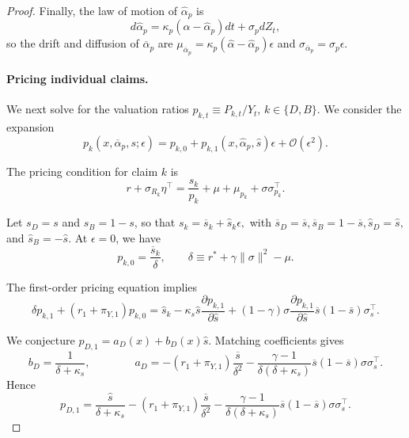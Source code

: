 \begin{proof}
Finally, the law of motion of $\hat{\alpha}_p$ is
\begin{equation}
    d \hat{\alpha}_p = \kappa_p ( \hat{\alpha} - \hat{\alpha}_p )dt + \sigma_p d Z_t,
\end{equation}
so the drift and diffusion of $\overline{\alpha}_p$ are $\mu_{\overline{\alpha}_p} = \kappa_p ( \hat{\alpha} - \hat{\alpha}_p )\epsilon$ and $\sigma_{\overline{\alpha}_p} = \sigma_p \epsilon$.

\paragraph{Pricing individual claims.}
We next solve for the valuation ratios $p_{k,t} \equiv P_{k,t}/Y_t$, $k\in\{D,B\}$.
We consider the expansion
\begin{equation}
    p_k(x, \overline{\alpha}_p, s;\epsilon) = p_{k,0} + p_{k,1}(x, \hat{\alpha}_p, \hat{s}) \epsilon + \mathcal{O}(\epsilon^2).
\end{equation}

The pricing condition for claim $k$ is
\begin{equation}
    r + \sigma_{R_k} \eta^\top = \frac{s_k}{p_{k}} + \mu + \mu_{p_k} + \sigma \sigma_{p_k}^\top.
\end{equation}

Let $s_D=s$ and $s_B=1-s$, so that
$
    s_k = \overline{s}_k + \hat{s}_k \epsilon,
$
with
$
    \overline{s}_D=\overline{s}, \overline{s}_B=1-\overline{s}, 
    \hat{s}_D=\hat{s}, 
$ and $\hat{s}_B=-\hat{s}$.
At $\epsilon=0$, we have
\begin{equation}
    p_{k,0} = \frac{\overline{s}_k}{\delta}, \qquad
    \delta \equiv r^* + \gamma\|\sigma\|^2 - \mu.
\end{equation}

The first-order pricing equation implies
\begin{equation}
    \delta p_{k,1} + (r_1 + \pi_{Y,1}) p_{k,0} = \hat{s}_k - \kappa_s \hat{s} \frac{\partial p_{k,1}}{\partial \hat{s}} + (1-\gamma) \sigma \frac{\partial p_{k,1}}{\partial \hat{s}} \overline{s}(1-\overline{s})\sigma_s^\top.
\end{equation}

We conjecture
$p_{D,1} = a_D(x) + b_D(x) \hat{s}.$
Matching coefficients gives
\begin{equation}
    b_D = \frac{1}{\delta + \kappa_s},\qquad \qquad
    a_D = - (r_1 + \pi_{Y,1}) \frac{\overline{s}}{\delta^2} - \frac{\gamma-1}{\delta(\delta+\kappa_s)} \overline{s}(1-\overline{s}) \sigma \sigma_s^\top.
\end{equation}
Hence
\begin{equation}
    p_{D,1} = \frac{\hat{s}}{\delta + \kappa_s} - (r_1 + \pi_{Y,1}) \frac{\overline{s}}{\delta^2} - \frac{\gamma-1}{\delta(\delta+\kappa_s)} \overline{s}(1-\overline{s}) \sigma \sigma_s^\top.
\end{equation}


\end{proof}
